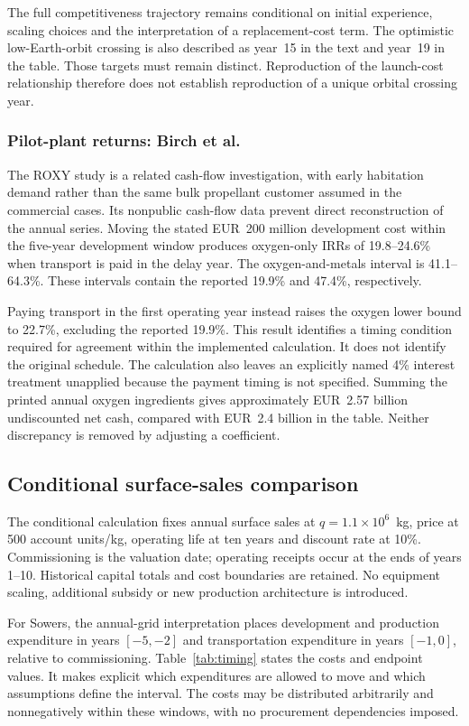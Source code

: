 \documentclass[final,5p,times,twocolumn]{elsarticle}
\begin{document}
The full competitiveness trajectory remains conditional on initial experience, scaling choices and the interpretation of a replacement-cost term. The optimistic low-Earth-orbit crossing is also described as year~15 in the text and year~19 in the table. Those targets must remain distinct. Reproduction of the launch-cost relationship therefore does not establish reproduction of a unique orbital crossing year.

\subsubsection{Pilot-plant returns: Birch et al.}
The ROXY study \cite{birch2026} is a related cash-flow investigation, with early habitation demand rather than the same bulk propellant customer assumed in the commercial cases. Its nonpublic cash-flow data prevent direct reconstruction of the annual series. Moving the stated EUR~200 million development cost within the five-year development window produces oxygen-only IRRs of 19.8--24.6\% when transport is paid in the delay year. The oxygen-and-metals interval is 41.1--64.3\%. These intervals contain the reported 19.9\% and 47.4\%, respectively.

Paying transport in the first operating year instead raises the oxygen lower bound to 22.7\%, excluding the reported 19.9\%. This result identifies a timing condition required for agreement within the implemented calculation. It does not identify the original schedule. The calculation also leaves an explicitly named 4\% interest treatment unapplied because the payment timing is not specified. Summing the printed annual oxygen ingredients gives approximately EUR~2.57 billion undiscounted net cash, compared with EUR~2.4 billion in the table. Neither discrepancy is removed by adjusting a coefficient.

\subsection{Conditional surface-sales comparison}\label{sec:conditional}
The conditional calculation fixes annual surface sales at $q=1.1\times10^6$~kg, price at 500 account units/kg, operating life at ten years and discount rate at 10\%. Commissioning is the valuation date; operating receipts occur at the ends of years 1--10. Historical capital totals and cost boundaries are retained. No equipment scaling, additional subsidy or new production architecture is introduced.

For Sowers, the annual-grid interpretation places development and production expenditure in years $[-5,-2]$ and transportation expenditure in years $[-1,0]$, relative to commissioning. Table~\ref{tab:timing} states the costs and endpoint values. It makes explicit which expenditures are allowed to move and which assumptions define the interval. The costs may be distributed arbitrarily and nonnegatively within these windows, with no procurement dependencies imposed.
\end{document}

